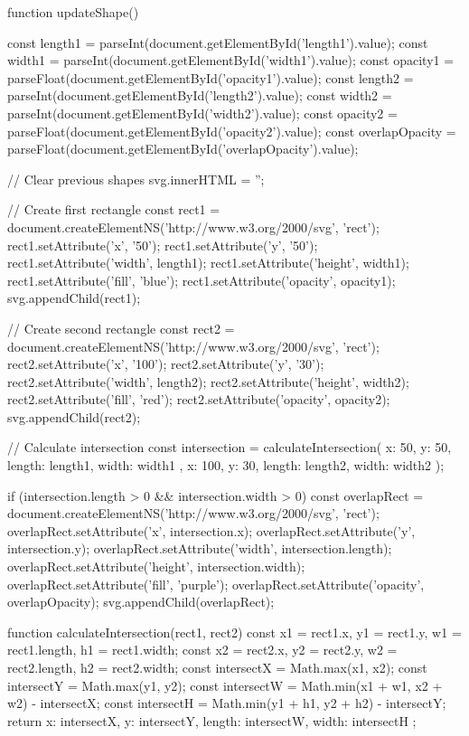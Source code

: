     function updateShape() {
      const length1 = parseInt(document.getElementById('length1').value);
      const width1 = parseInt(document.getElementById('width1').value);
      const opacity1 = parseFloat(document.getElementById('opacity1').value);
      const length2 = parseInt(document.getElementById('length2').value);
      const width2 = parseInt(document.getElementById('width2').value);
      const opacity2 = parseFloat(document.getElementById('opacity2').value);
      const overlapOpacity = parseFloat(document.getElementById('overlapOpacity').value);
      
      // Clear previous shapes
      svg.innerHTML = '';
      
      // Create first rectangle
      const rect1 = document.createElementNS('http://www.w3.org/2000/svg', 'rect');
      rect1.setAttribute('x', '50');
      rect1.setAttribute('y', '50');
      rect1.setAttribute('width', length1);
      rect1.setAttribute('height', width1);
      rect1.setAttribute('fill', 'blue');
      rect1.setAttribute('opacity', opacity1);
      svg.appendChild(rect1);
      
      // Create second rectangle
      const rect2 = document.createElementNS('http://www.w3.org/2000/svg', 'rect');
      rect2.setAttribute('x', '100');
      rect2.setAttribute('y', '30');
      rect2.setAttribute('width', length2);
      rect2.setAttribute('height', width2);
      rect2.setAttribute('fill', 'red');
      rect2.setAttribute('opacity', opacity2);
      svg.appendChild(rect2);
      
      // Calculate intersection
      const intersection = calculateIntersection({
        x: 50, y: 50, length: length1, width: width1
      }, {
        x: 100, y: 30, length: length2, width: width2
      });
      
      if (intersection.length > 0 && intersection.width > 0) {
        const overlapRect = document.createElementNS('http://www.w3.org/2000/svg', 'rect');
        overlapRect.setAttribute('x', intersection.x);
        overlapRect.setAttribute('y', intersection.y);
        overlapRect.setAttribute('width', intersection.length);
        overlapRect.setAttribute('height', intersection.width);
        overlapRect.setAttribute('fill', 'purple');
        overlapRect.setAttribute('opacity', overlapOpacity);
        svg.appendChild(overlapRect);
      }
    }
    
    function calculateIntersection(rect1, rect2) {
      const x1 = rect1.x, y1 = rect1.y, w1 = rect1.length, h1 = rect1.width;
      const x2 = rect2.x, y2 = rect2.y, w2 = rect2.length, h2 = rect2.width;
      const intersectX = Math.max(x1, x2);
      const intersectY = Math.max(y1, y2);
      const intersectW = Math.min(x1 + w1, x2 + w2) - intersectX;
      const intersectH = Math.min(y1 + h1, y2 + h2) - intersectY;
      return { x: intersectX, y: intersectY, length: intersectW, width: intersectH };
    }
    
